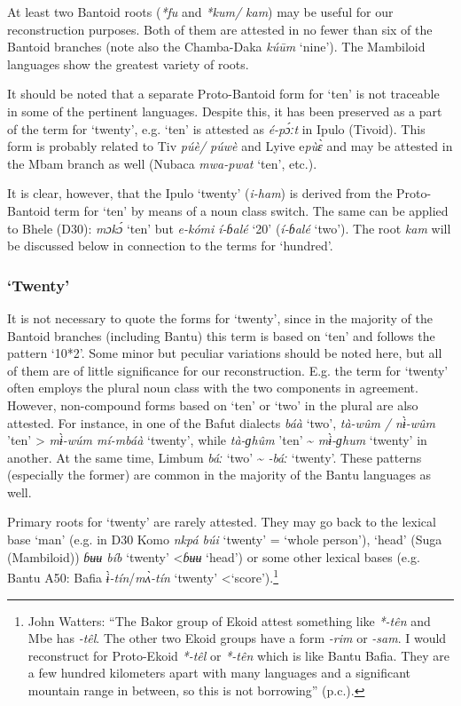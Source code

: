 At least two Bantoid roots (\textit{*fu} and \textit{*kum/ kam}) may be useful for our reconstruction purposes. Both of them are attested in no fewer than six of the Bantoid branches (note also the Chamba-Daka \textit{kú{\={u}}m} `nine'). The Mambiloid languages show the greatest variety of roots.

It should be noted that a separate Proto-Bantoid form for `ten' is not traceable in some of the pertinent languages. Despite this, it has been preserved as a part of the term for `twenty', e.g. `ten' is attested as \textit{é-p{\'{ɔ}}ːt} in Ipulo (Tivoid). This form is probably related to Tiv \textit{púè/ púwè} and Lyive e\textit{pù{\`{ɛ}}} and may be attested in the Mbam branch as well (Nubaca \textit{mwa-pwat} ‘ten’, etc.).

It is clear, however, that the Ipulo `twenty' (\textit{i-ham}) is derived from the Proto-Bantoid term for `ten' by means of a noun class switch. The same can be applied to Bhele (D30): \textit{mɔk{\'{ɔ}}} ‘ten’ but \textit{e-kómi í-ɓalé} ‘20’ (\textit{í-ɓalé} ‘two’). The root \textit{kam} will be discussed below in connection to the terms for `hundred'. 

\newpage  
\subsubsection{‘Twenty’}\label{sec:3.1.1.9}
It is not necessary to quote the forms for `twenty', since in the majority of the Bantoid branches (including Bantu) this term is based on `ten' and follows the pattern ‘10*2’. Some minor but peculiar variations should be noted here, but all of them are of little significance for our reconstruction. E.g. the term for `twenty' often employs the plural noun class with the two components in agreement. However, non-compound forms based on `ten' or `two' in the plural are also attested. For instance, in one of the Bafut dialects \textit{báà} ‘two’, \textit{tà-wûm / n{\`{ɨ}}-wûm} ’ten’ > \textit{m{\`{ɨ}}-wúm mí-mbáà} ‘twenty’, while \textit{tà-ɡhûm} ’ten’ {\textasciitilde} \textit{m{\`{ɨ}}-ɡhum} ‘twenty’ in another. At the same time, Limbum \textit{báː} ‘two’ {\textasciitilde} \textit{{}-báː} ‘twenty’. These patterns (especially the former) are common in the majority of the Bantu languages as well. 

Primary roots for `twenty' are rarely attested. They may go back to the lexical base `man' (e.g. in D30 Komo \textit{nkpá búi} ‘twenty’ = ‘whole person’), `head' (Suga (Mambiloid)) \textit{ɓʉʉ bíb} ‘twenty’ <\textit{ɓʉʉ} ‘head’) or some other lexical bases (e.g. Bantu A50: Bafia \textit{{\`{ɨ}}-tín}/\textit{m{\`{ʌ}}-tín} ‘twenty’ <`score').\footnote{John Watters: “The Bakor group of Ekoid attest something like \textit{*-tên} and Mbe has \textit{-têl}. The other two Ekoid groups have a form \textit{-rim} or \textit{-sam}. I would reconstruct for Proto-Ekoid \textit{*-têl} or \textit{*-tên} which is like Bantu Bafia. They are a few hundred kilometers apart with many languages and a significant mountain range in between, so this is not borrowing'' (p.c.).} 

